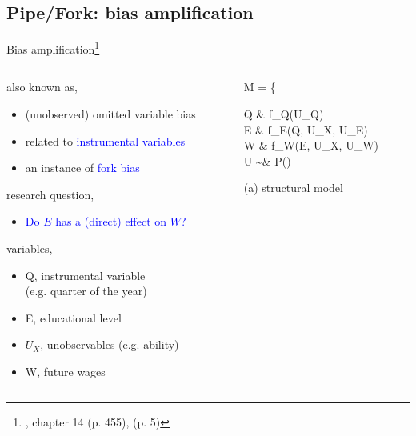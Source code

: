 \subsection{Pipe/Fork: bias amplification}
%
%
\begin{frame}[t, negative]
	\subsectionpage
\end{frame}
%
%
\begin{frame}
	{Bias amplification\footnote{\citet{McElreath_2020}, chapter 14 (p. 455), \citet{Cinelli_et_al_2021} (p. 5)}}
	\begin{columns}
		\begin{column}{0.5\textwidth}
			also known as,
			\begin{itemize}
				\item (unobserved) omitted variable bias
				\item related to \textcolor{blue}{instrumental variables}
				\item an instance of \textcolor{blue}{fork bias}
			\end{itemize}
			
			research question, 
			\begin{itemize}
				\item \textcolor{blue}{Do $E$ has a (direct) effect on $W$?}
			\end{itemize}
			
			variables,
			\begin{itemize}
				\item Q, instrumental variable \\
				(e.g. quarter of the year)
				\item E, educational level
				\item $U_{X}$, unobservables (e.g. ability)
				\item W, future wages
			\end{itemize}
		\end{column}
		\begin{column}{0.5\textwidth}  
			\begin{equ}
				M = \left\{ \begin{aligned} 
					Q \leftarrow & \; f_{Q}(U_{Q}) \\
					E \leftarrow & \; f_{E}(Q, U_{X}, U_{E}) \\
					W \leftarrow & \; f_{W}(E, U_{X}, U_{W}) \\
					U \sim & \; P()
				\end{aligned} \right
				\caption*{(a) structural model}
			\end{equ}
			\begin{figure}
\end{figure}
\end{column}
\end{columns}
\end{frame}
